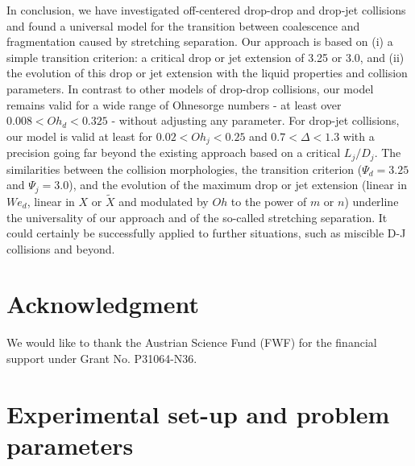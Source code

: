 \documentclass{article}
\begin{document}
In conclusion, we have investigated off-centered  drop-drop and drop-jet collisions and found a universal  model for the transition  between coalescence and fragmentation caused by stretching separation. Our approach is based on (i) a simple transition criterion: a critical drop or jet extension of {3.25 or 3.0},  and (ii) the evolution of this drop or jet extension with the liquid properties and collision parameters. In contrast to other models of drop-drop collisions, our model remains valid for a wide range of Ohnesorge numbers - at least  over $0.008<Oh_d<0.325$ - without adjusting any parameter. For drop-jet collisions, our model is valid at least for $0.02<Oh_j<0.25$ and $0.7<\Delta<1.3$ with a precision going far beyond  the existing approach based on a critical $L_j/D_j$. The similarities between the collision morphologies, the transition criterion ({$\Psi_d=3.25$ and $\Psi_j=3.0$}), and the evolution of the maximum drop or jet extension (linear in $We_d$, linear in $X$ or $\tilde{X}$ and modulated by $Oh$ to the power of $m$ or $n$) underline the universality of our approach and of the so-called stretching separation. It could certainly be successfully applied to further situations, {such as miscible D-J collisions and beyond}.
\FloatBarrier

\section*{Acknowledgment}
We would like to thank the Austrian Science Fund (FWF) for the financial support under Grant No. P31064-N36.


\appendix
\section{Experimental set-up and problem parameters}\label{appA}
\end{document}
